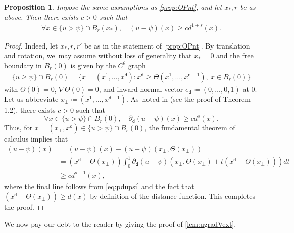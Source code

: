 \documentclass[JEP,XML,SOM,Unicode,published]{cedram}
\theoremstyle{plain}
\newtheorem{prop}[thm]{Proposition}
\theoremstyle{definition}
\let\nab\nabla
\let\p\partial
\renewcommand{\d}{\mathsf{d}}
\begin{document}
\begin{prop}\label{prop:OPreglb}
Impose the same assumptions as \cref{prop:OPnt}, and let $x_*,r$ be as above. Then there exists $c>0$ such that
\begin{align*}
\forall x\in \{u>\psi\} \cap B_{r}(x_*), \quad (u-\psi)(x) \ge cd^{1+s}(x).
\end{align*}
\end{prop}
\begin{proof}
Indeed, let $x_*,r,r'$ be as in the statement of \cref{prop:OPnt}. By translation and rotation, we~may assume without loss of generality that $x_* = 0$ and the free boundary in $B_r(0)$ is given by the $C^\theta$ graph
\begin{align*}
\{u\ge \psi\} \cap B_{r}(0) = \bigl\{x = (x^1,\ldots,x^\d) : x^\d \ge \Theta(x^1,\ldots,x^{\d-1}) , \ x\in B_r(0)\bigr\}
\end{align*}
with $\Theta(0) =0$, $\nab\Theta(0)=0$, and inward normal vector $e_\d \coloneqq (0,\ldots,0,1)$ at $0$. Let us abbreviate $x_\perp \coloneqq (x^1,\ldots,x^{\d-1})$. As~noted in \cite{ArO2020} (see the proof of Theorem 1.2), there exists $c>0$ such that
\begin{equation}\label{eq:pdupsi}
\forall x\in \{u>\psi\} \cap B_r(0),\quad\p_\d(u-\psi)(x) \ge c d^s(x).
\end{equation}
Thus, for $x=(x_\perp, x^\d) \in \{u>\psi\} \cap B_r(0)$, the fundamental theorem of calculus implies that
\begin{align*}
(u-\psi)(x) &= (u-\psi)(x)- (u-\psi)(x_\perp, \Theta(x_\perp))\\
& = (x^\d - \Theta(x_\perp))\int_0^1 \p_{\d}(u-\psi)(x_\perp, \Theta(x_\perp) + t(x^{\d}-\Theta(x_\perp))) dt\\
&\ge cd^{s+1}(x),
\end{align*}
where the final line follows from \eqref{eq:pdupsi} and the fact that $(x^\d - \Theta(x_\perp)) \ge d(x)$ by definition of the distance function. This completes the proof.
\end{proof}

We now pay our debt to the reader by giving the proof of \cref{lem:ugradVext}.
\end{document}
